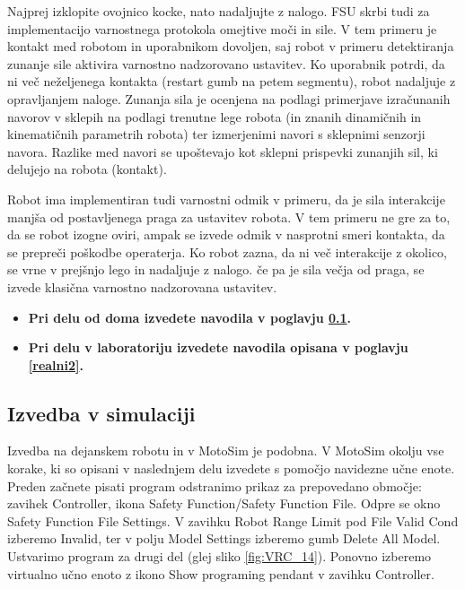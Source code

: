 Najprej izklopite ovojnico kocke, nato nadaljujte z nalogo. FSU skrbi tudi za implementacijo varnostnega protokola omejtive moči in sile. V tem primeru je kontakt med robotom in uporabnikom dovoljen, saj robot v primeru detektiranja zunanje sile aktivira varnostno nadzorovano ustavitev. Ko uporabnik potrdi, da ni več neželjenega kontakta (restart gumb na petem segmentu), robot nadaljuje z opravljanjem naloge. Zunanja sila je ocenjena na podlagi primerjave izračunanih navorov v sklepih na podlagi trenutne lege robota (in znanih dinamičnih in kinematičnih parametrih robota) ter izmerjenimi navori s sklepnimi senzorji  navora. Razlike med navori se upoštevajo kot sklepni prispevki zunanjih sil, ki delujejo na robota (kontakt).

Robot ima implementiran tudi varnostni odmik v primeru, da je sila interakcije manjša od postavljenega praga za ustavitev robota. V tem primeru ne gre za to, da se robot izogne oviri, ampak se izvede odmik v nasprotni smeri kontakta, da se prepreči poškodbe operaterja. Ko robot zazna, da ni več interakcije z okolico, se vrne v prejšnjo lego in nadaljuje z nalogo. če pa je sila večja od praga, se izvede klasična varnostno nadzorovana ustavitev.

\begin{mdframed}[backgroundcolor=red!20, shadow=true,roundcorner=8pt]
	\begin{itemize}
		\item \textbf{Pri delu od doma izvedete navodila v poglavju \ref{sim2}.}
		\item \textbf{Pri delu v laboratoriju izvedete navodila opisana v poglavju \ref{realni2}.}		
	\end{itemize}
\end{mdframed}

\subsection{Izvedba v simulaciji} \label{sim2}

Izvedba na dejanskem robotu in v MotoSim je podobna. V MotoSim okolju vse korake, ki so opisani v naslednjem delu izvedete s pomočjo navidezne učne enote. Preden začnete pisati program odstranimo prikaz za prepovedano območje: zavihek Controller, ikona Safety Function/Safety Function File. Odpre se okno Safety Function File Settings. V zavihku Robot Range Limit pod File Valid Cond izberemo Invalid, ter v polju Model Settings izberemo gumb Delete All Model.
Ustvarimo program za drugi del (glej sliko \ref{fig:VRC_14}). Ponovno izberemo virtualno učno enoto z ikono Show programing pendant v zavihku Controller. 

